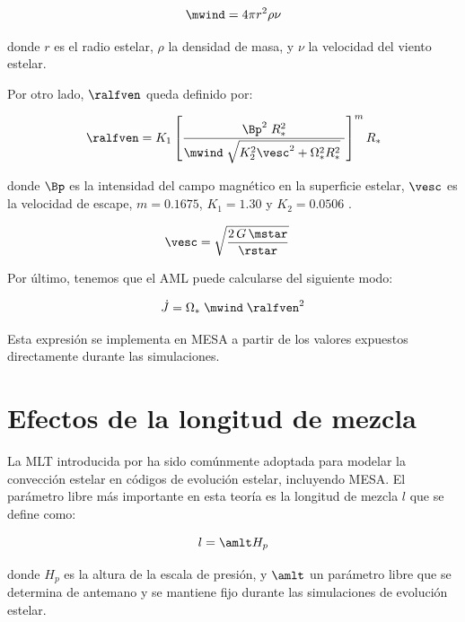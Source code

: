 \begin{ceqn}
	\begin{equation}
		\mwind = 4\pi r^2\rho\nu \label{eq:mass_loss}
	\end{equation}
\end{ceqn}

donde $r$ es el radio estelar, $\rho$ la densidad de masa, y $\nu$ la velocidad del viento estelar.

Por otro lado, $\ralfven$ queda definido por:

\begin{equation}
	\ralfven = K_1\left[\frac{\Bp^{2}\;R_*^{2}}{\mwind\;\sqrt{K_2^2\vesc^2 + \Omega_*^2R_*^{2}}\ }\right]^{m}R_*  \label{eq:mb_ralfven}
\end{equation}

donde $\Bp$ es la intensidad del campo magnético en la superficie estelar, $\vesc$ es la velocidad de escape, $m = 0.1675$, $K_1 = 1.30$ y $K_2 = 0.0506$ \citep{Gallet2013}.

\begin{align}
	\vesc &= \sqrt{\frac{2\,G\,\mstar}{\rstar}} \label{eq:vesc2}
\end{align}

Por último, tenemos que el AML puede calcularse del siguiente modo:

\begin{equation}
	\Dot{J} = \Omega_* \; \mwind \; \ralfven^{2} \label{eq:j_dot}
\end{equation}

Esta expresión se implementa en MESA a partir de los valores expuestos directamente durante las simulaciones.

\section{Efectos de la longitud de mezcla}
La MLT introducida por \citet{BohmVit58} ha sido comúnmente adoptada para modelar la convección estelar en códigos de evolución estelar, incluyendo MESA. El parámetro libre más importante en esta teoría es la longitud de mezcla $l$ que se define como:

\begin{equation}
	l = \amlt H_p\label{eq:mixlength}
\end{equation}

donde $H_p$ es la altura de la escala de presión, y $\amlt$ un parámetro libre que se determina de antemano y se mantiene fijo durante las simulaciones de evolución estelar. \par

